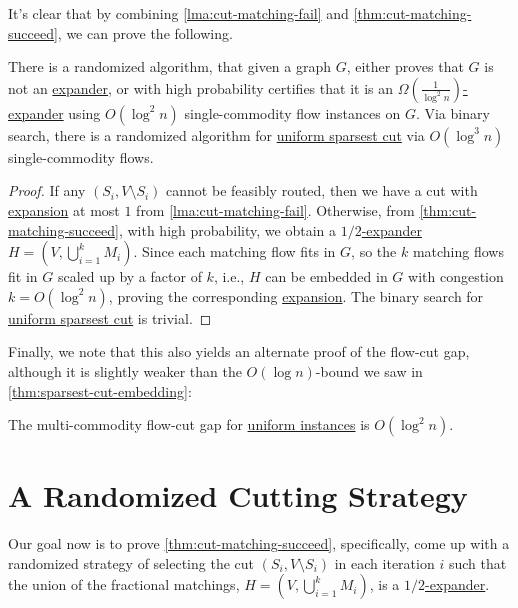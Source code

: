 It's clear that by combining \autoref{lma:cut-matching-fail} and \autoref{thm:cut-matching-succeed}, we can prove the following.

\begin{corollary}\label{col:cut-matching-sparsest-cut}
	There is a randomized algorithm, that given a graph \(G\), either proves that \(G\) is not an \hyperref[def:expander]{expander}, or with high probability certifies that it is an \hyperref[def:expander]{\(\Omega (\frac{1}{\log ^2 n})\)-expander} using \(O(\log ^2 n)\) single-commodity flow instances on \(G\). Via binary search, there is a randomized algorithm for \hyperref[prb:sparsest-cut]{uniform sparsest cut} via \(O(\log ^3 n)\) single-commodity flows.
\end{corollary}
\begin{proof}
	If any \((S_i, V\setminus S_i)\) cannot be feasibly routed, then we have a cut with \hyperref[def:expansion]{expansion} at most \(1\) from \autoref{lma:cut-matching-fail}. Otherwise, from \autoref{thm:cut-matching-succeed}, with high probability, we obtain a \hyperref[def:expander]{\(1 / 2\)-expander} \(H = (V, \bigcup_{i=1}^{k} M_i)\). Since each matching flow fits in \(G\), so the \(k\) matching flows fit in \(G\) scaled up by a factor of \(k\), i.e., \(H\) can be embedded in \(G\) with congestion \(k = O(\log ^2 n)\), proving the corresponding \hyperref[def:expansion]{expansion}. The binary search for \hyperref[prb:sparsest-cut]{uniform sparsest cut} is trivial.
\end{proof}

Finally, we note that this also yields an alternate proof of the flow-cut gap, although it is slightly weaker than the \(O(\log n)\)-bound we saw in \autoref{thm:sparsest-cut-embedding}:

\begin{corollary}
	The multi-commodity flow-cut gap for \hyperref[prb:sparsest-cut]{uniform instances} is \(O(\log ^2 n)\).
\end{corollary}

\section{A Randomized Cutting Strategy}
Our goal now is to prove \autoref{thm:cut-matching-succeed}, specifically, come up with a randomized strategy of selecting the cut \((S_i, V\setminus S_i)\) in each iteration \(i\) such that the union of the fractional matchings, \(H = (V, \bigcup_{i=1}^{k} M_i)\), is a \hyperref[def:expander]{\(1 / 2\)-expander}.

